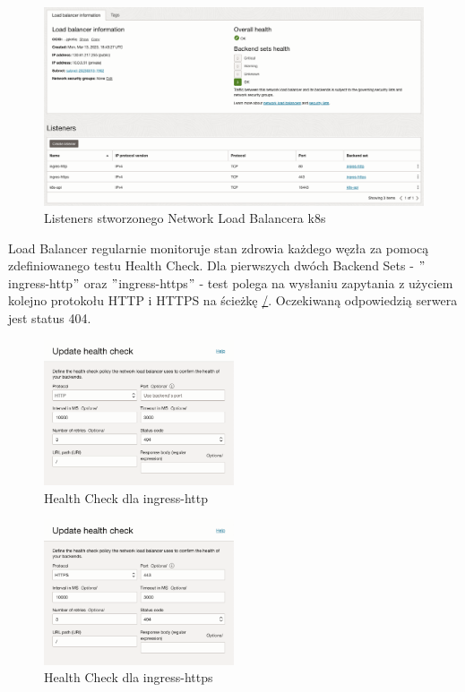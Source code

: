 \begin{figure}[H]
    \centering
    \includegraphics[width=\textwidth]{img/oci-network-load-balancer-k8s-listeners}
    \caption{Listeners stworzonego Network Load Balancera k8s}
    \label{fig:oci-network-load-balancer-k8s-listeners}
\end{figure}

Load Balancer regularnie monitoruje stan zdrowia każdego węzła za pomocą zdefiniowanego testu Health Check.
Dla pierwszych dwóch Backend Sets - \("\)ingress-http\("\) oraz \("\)ingress-https\("\) - test polega na wysłaniu zapytania z użyciem kolejno protokołu HTTP i HTTPS na ścieżkę \url{/}.
Oczekiwaną odpowiedzią serwera jest status 404.

\begin{multicols}{2}
    \begin{figure}[H]
        \centering
        \includegraphics[width=0.5\textwidth]{img/oci-network-load-balancer-ingress-http-health-check}
        \caption{Health Check dla ingress-http}
        \label{fig:oci-network-load-balancer-ingress-http-health-check}
    \end{figure}
    \begin{figure}[H]
        \centering
        \includegraphics[width=0.5\textwidth]{img/oci-network-load-balancer-ingress-https-health-check}
        \caption{Health Check dla ingress-https}
        \label{fig:oci-network-load-balancer-ingress-https-health-check}
    \end{figure}
\end{multicols}


